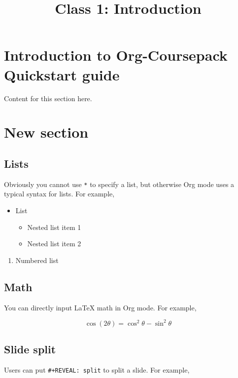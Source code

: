 \documentclass[10pt,article]{article}
\date{\vspace{-6ex}}
\title{Class 1: Introduction}
\begin{document}
\maketitle
{} 
\thispagestyle{fancy}

\setcounter{tocdepth}{1}
\tableofcontents
\vspace{6ex}

\section{Introduction to Org-Coursepack Quickstart guide}
\label{sec:orgf7bfc3b}
Content for this section here.
\section{New section}
\label{sec:org343d404}
\subsection{Lists}
\label{sec:org2b934c8}
Obviously you cannot use \texttt{*} to specify a list, but otherwise Org mode
uses a typical syntax for lists. For example,

\begin{itemize}
\item List
\begin{itemize}
\item Nested list item 1
\item Nested list item 2
\end{itemize}
\end{itemize}


\begin{enumerate}
\item Numbered list
\end{enumerate}

\subsection{Math}
\label{sec:org00c21b2}
You can directly input \LaTeX{} math in Org mode. For example,

\[ \cos (2\theta) = \cos^2 \theta - \sin^2 \theta \]
\subsection{Slide split}
\label{sec:org8c23102}
Users can put \texttt{\#+REVEAL: split} to split a slide. For example,
\end{document}
